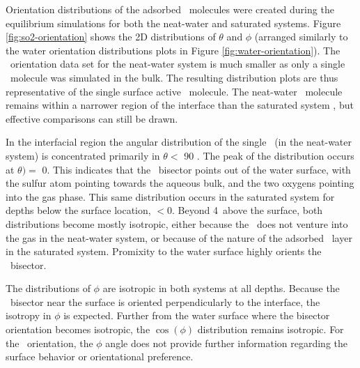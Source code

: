 Orientation distributions of the adsorbed \suldiox~molecules were created during the equilibrium simulations for both the neat-water and saturated systems. Figure \ref{fig:so2-orientation} shows the 2D distributions of $\theta$ and $\phi$ (arranged similarly to the water orientation distributions plots in Figure \ref{fig:water-orientation}). The \suldiox~orientation data set for the neat-water system is much smaller as only a single \suldiox~molecule was simulated in the bulk. The resulting distribution plots are thus representative of the single surface active \suldiox~molecule. The neat-water \suldiox~molecule remains within a narrower region of the interface than the saturated system \suldiox, but effective comparisons can still be drawn.

In the interfacial region the angular distribution of the single \suldiox~(in the neat-water system) is concentrated primarily in $\theta \lt$ 90 \textdegree. The peak of the distribution occurs at $\theta)=$ 0\textdegree. This indicates that the \suldiox~bisector points out of the water surface, with the sulfur atom pointing towards the aqueous bulk, and the two oxygens pointing into the gas phase. This same distribution occurs in the saturated system for depths below the surface location, $\lt 0$\angs. Beyond 4\angs~above the surface, both distributions become mostly isotropic, either because the \suldiox~does not venture into the gas in the neat-water system, or because of the nature of the adsorbed \suldiox~layer in the saturated system. Promixity to the water surface highly orients the \suldiox~bisector. %

The distributions of $\phi$ are isotropic in both systems at all depths. Because the \suldiox~bisector near the surface is oriented perpendicularly to the interface, the isotropy in $\phi$ is expected. Further from the water surface where the bisector orientation becomes isotropic, the $\cos(\phi)$ distribution remains isotropic. For the \suldiox~orientation, the $\phi$ angle does not provide further information regarding the surface behavior or orientational preference.

